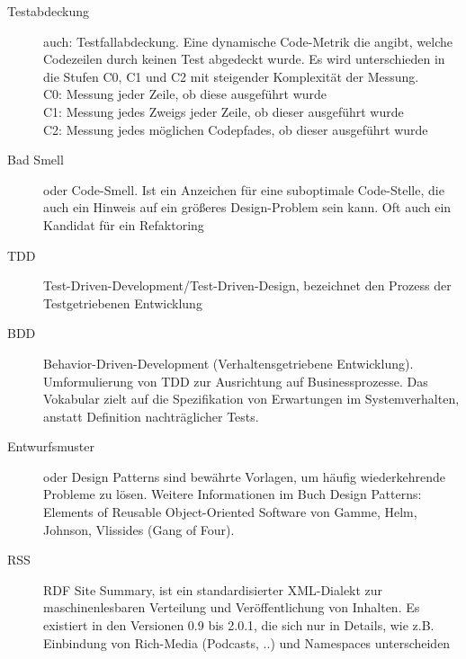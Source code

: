 \begin{description}
 \item[Testabdeckung] auch: Testfallabdeckung. Eine dynamische Code-Metrik die angibt, welche Codezeilen durch keinen Test abgedeckt wurde. Es wird unterschieden in die Stufen C0, C1 und C2 mit steigender Komplexität der Messung.\\
 C0: Messung jeder Zeile, ob diese ausgeführt wurde\\
 C1: Messung jedes Zweigs jeder Zeile, ob dieser ausgeführt wurde\\
 C2: Messung jedes möglichen Codepfades, ob dieser ausgeführt wurde
 \item[Bad Smell] oder Code-Smell. Ist ein Anzeichen für eine suboptimale Code-Stelle, die auch ein Hinweis auf ein größeres Design-Problem sein kann. Oft auch ein Kandidat für ein Refaktoring
 \item[TDD] Test-Driven-Development/Test-Driven-Design, bezeichnet den Prozess der Testgetriebenen Entwicklung
 \item[BDD] Behavior-Driven-Development (Verhaltensgetriebene Entwicklung). Umformulierung von TDD zur Ausrichtung auf Businessprozesse. Das Vokabular zielt auf die Spezifikation von Erwartungen im Systemverhalten, anstatt Definition nachträglicher Tests.
 \item[Entwurfsmuster] oder Design Patterns sind bewährte Vorlagen, um häufig wiederkehrende Probleme zu lösen. Weitere Informationen im Buch Design Patterns: Elements of Reusable Object-Oriented Software von Gamme, Helm, Johnson, Vlissides (Gang of Four).
\item[RSS] RDF Site Summary, ist ein standardisierter XML-Dialekt zur maschinenlesbaren Verteilung und Veröffentlichung von Inhalten. Es existiert in den Versionen 0.9 bis 2.0.1, die sich nur in Details, wie z.B. Einbindung von Rich-Media (Podcasts, ..) und Namespaces unterscheiden
\end{description}
\newpage